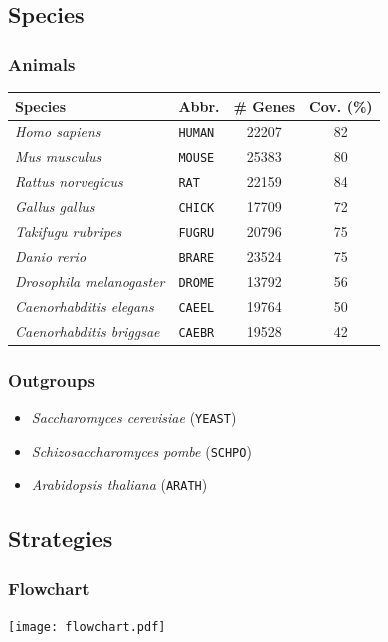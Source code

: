 \documentclass{beamer}
\begin{document}
\subsection{Species}
\begin{frame}
	\frametitle{Animals}
	\begin{center}
	\begin{tabular}{|l|l|c|c|}
	\hline
	Species & Abbr. & \# Genes & Cov. (\%) \\
	\hline
	\textit{Homo sapiens} & \texttt{HUMAN} & 22207 & 82 \\
	\textit{Mus musculus} & \texttt{MOUSE} & 25383 & 80 \\
	\textit{Rattus norvegicus} & \texttt{RAT} & 22159 & 84 \\
	\textit{Gallus gallus} & \texttt{CHICK} & 17709 & 72 \\
	\textit{Takifugu rubripes} & \texttt{FUGRU} & 20796 & 75 \\
	\textit{Danio rerio} & \texttt{BRARE} & 23524 & 75 \\
	\textit{Drosophila melanogaster} & \texttt{DROME} & 13792 & 56 \\
	\textit{Caenorhabditis elegans} & \texttt{CAEEL} & 19764 & 50 \\
	\textit{Caenorhabditis briggsae} & \texttt{CAEBR} & 19528 & 42 \\
	\hline
	\end{tabular}
	\end{center}
\end{frame}
\begin{frame}
	\frametitle{Outgroups}
	\begin{itemize}
	\item \textit{Saccharomyces cerevisiae} (\texttt{YEAST})
	\item \textit{Schizosaccharomyces pombe} (\texttt{SCHPO})
	\item \textit{Arabidopsis thaliana} (\texttt{ARATH})
	\end{itemize}
\end{frame}
\subsection{Strategies}
\begin{frame}
	\frametitle{Flowchart}
	\texttt{[image: flowchart.pdf]}
\end{frame}
\end{document}
